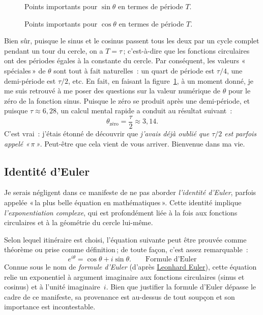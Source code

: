 \begin{figure}
\begin{center}
\end{center}
\caption{Points importants pour $\sin\theta$ en termes de période $T$.\label{fig:sine_with_tau}}
\end{figure}

\begin{figure}
\begin{center}
\end{center}
\caption{Points importants pour $\cos\theta$ en termes de période $T$.\label{fig:cosine_with_tau}}
\end{figure}

Bien sûr, puisque le sinus et le cosinus passent tous les deux par un cycle complet pendant un tour du cercle, on a $T = \tau$\,; c'est-à-dire que les fonctions circulaires ont des périodes égales à la constante du cercle. Par conséquent, les valeurs «\,spéciales\,»  de $\theta$ sont tout à fait naturelles~: un quart de période est $\tau/4$, une demi-période est $\tau/2$, etc. En fait, en faisant la figure~\ref{fig:sine_with_tau}, à un moment donné, je me suis retrouvé à me poser des questions sur la valeur numérique de $\theta$ pour le zéro de la fonction sinus. Puisque le zéro se produit après une demi-période, et puisque $\tau \approx 6{,}28$, un calcul mental rapide a conduit au résultat suivant~:
\[
  \theta_\mathrm{zéro} = \frac{\tau}{2} \approx 3{,}14.
\]
C'est vrai~: j'étais étonné de découvrir que \emph{j'avais déjà oublié que $\tau/2$ est parfois appelé «\,$\pi$\,»}. Peut-être que cela vient de vous arriver. Bienvenue dans ma vie.



   \subsection{Identité d'Euler} %
   \label{sec:euler_s_identity}

Je serais négligent dans ce manifeste de ne pas aborder \emph{l'identité d'Euler}, parfois appelée «\,la plus belle équation en mathématiques\,». Cette identité implique \emph{l'exponentiation complexe}, qui est profondément liée à la fois aux fonctions circulaires et à la géométrie du cercle lui-même.

Selon lequel itinéraire est choisi, l'équation suivante peut être prouvée comme théorème ou prise comme définition\,; de toute façon, c'est assez remarquable~:
\begin{equation}
\label{eq:eulers_formula}
e^{i\theta} = \cos\theta + i\sin\theta. \qquad\mbox{Formule d'Euler}
\end{equation}
Connue sous le nom de \emph{formule d'Euler} (d'après \href{https://en.wikipedia.org/wiki/Leonhard_Euler}{Leonhard Euler}), cette équation relie un exponentiel à argument imaginaire aux fonctions circulaires (sinus et cosinus) et à l'unité imaginaire~$i$. Bien que justifier la formule d'Euler dépasse le cadre de ce manifeste, sa provenance est au-dessus de tout soupçon et son importance est incontestable.

